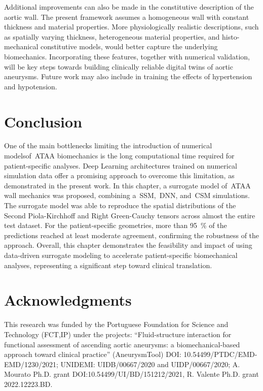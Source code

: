 \documentclass[a4paper,fleqn]{cas-sc}
\begin{document}
Additional improvements can also be made in the constitutive description of the aortic wall. The present framework assumes a homogeneous wall with constant thickness and material properties. More physiologically realistic descriptions, such as spatially varying thickness, heterogeneous material properties, and histo-mechanical constitutive models, would better capture the underlying biomechanics. Incorporating these features, together with numerical validation, will be key steps towards building clinically reliable digital twins of aortic aneurysms. Future work may also include in training the effects of hypertension and hypotension.

\section{Conclusion} \label{sec:conclusion}
One of the main bottlenecks limiting the introduction of numerical modelsof~\gls{ATAA} biomechanics is the long computational time required for patient-specific analyses. Deep Learning architectures trained on numerical simulation data offer a promising approach to overcome this limitation, as demonstrated in the present work. In this chapter, a surrogate model of~\gls{ATAA} wall mechanics was proposed, combining a~\gls{SSM},~\gls{DNN}, and~\gls{CSM} simulations. The surrogate model was able to reproduce the spatial distributions of the Second Piola-Kirchhoff and Right Green-Cauchy tensors across almost the entire test dataset. For the patient-specific geometries, more than 95~\% of the predictions reached at least moderate agreement, confirming the robustness of the approach. Overall, this chapter demonstrates the feasibility and impact of using data-driven surrogate modeling to accelerate patient-specific biomechanical analyses, representing a significant step toward clinical translation.

\section*{Acknowledgments}
This research was funded by the Portuguese Foundation for Science and Technology (FCT,IP) under the projects: “Fluid-structure interaction for functional assessment of ascending aortic aneurysms: a biomechanical-based approach toward clinical practice” (AneurysmTool) DOI: 10.54499/PTDC/EMD-EMD/1230/2021; UNIDEMI: UIDB/00667/2020 and UIDP/00667/2020; A. Mourato Ph.D. grant DOI:10.54499/UI/BD/151212/2021, R. Valente Ph.D. grant 2022.12223.BD.

\printcredits


%


\end{document}
